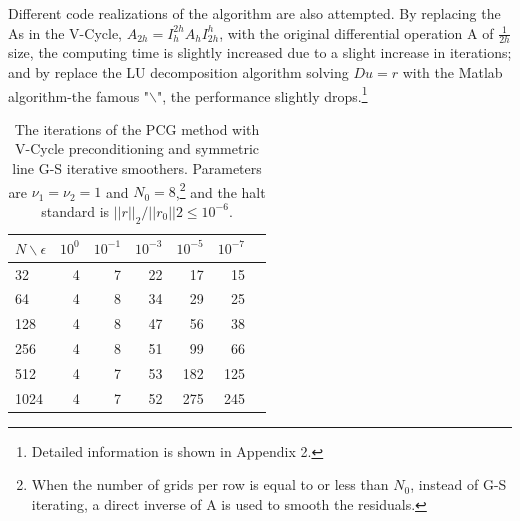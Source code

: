 \documentclass{article}
\begin{document}
Different code realizations of the algorithm are also attempted. By replacing the As in the V-Cycle, $A_{2h}=I_{h}^{2h}A_{h}I_{2h}^{h}$, with the original differential operation A of $\frac{1}{2h}$ size, the computing time is slightly increased due to a slight increase in iterations; and by replace the LU decomposition algorithm solving $Du=r$ with the Matlab algorithm-the famous "$\backslash$", the performance slightly drops.\footnote{Detailed information is shown in Appendix 2. }

\begin{table}[t]
\caption{The iterations of the PCG method with V-Cycle preconditioning and symmetric line G-S iterative smoothers. Parameters are $\nu_1=\nu_2=1$ and $N_0=8$,\footnote{When the number of grids per row is equal to or less than $N_0$, instead of G-S iterating, a direct inverse of A is used to smooth the residuals.} and the halt standard is $||r||_2/||r_0||2\le10^{-6}$. }
\label{tab2}
\vskip 0.15in
\begin{center}
\begin{small}
\begin{sc}
\begin{tabular}{lrrrrrr}
\toprule
$N\backslash\epsilon$ & $10^0$ & $10^{-1}$ & $10^{-3}$ & $10^{-5}$ & $10^{-7}$ \\
\midrule
32 & 4 & 7 & 22 & 17 & 15 \\
64 & 4 & 8 & 34 & 29 & 25 \\
128 & 4 & 8 & 47 & 56 & 38 \\
256 & 4 & 8 & 51 & 99 & 66 \\
512 & 4 & 7 & 53 & 182 & 125 \\
1024 & 4 & 7 & 52 & 275 & 245 \\
\bottomrule
\end{tabular}
\end{sc}
\end{small}
\end{center}
\vskip -0.1in
\end{table}
\end{document}
